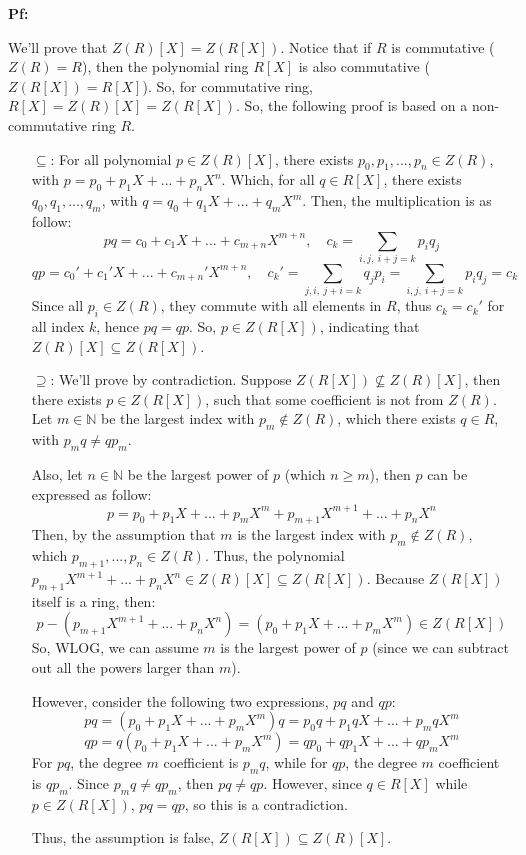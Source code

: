 \documentclass{article}
\begin{document}
\textbf{Pf:}

We'll prove that $Z(R)[X]=Z(R[X])$. Notice that if $R$ is commutative ($Z(R)=R$), then the polynomial ring $R[X]$ is also commutative ($Z(R[X])=R[X]$).
So, for commutative ring, $R[X]=Z(R)[X]=Z(R[X])$. So, the following proof is based on a non-commutative ring $R$.

\begin{itemize}
    \item[$\subseteq$:] For all polynomial $p\in Z(R)[X]$, there exists $p_0,p_1,...,p_n\in Z(R)$, with $p = p_0+p_1X+...+p_nX^n$.
    Which, for all $q\in R[X]$, there exists $q_0,q_1,...,q_m$, with $q = q_0+q_1X+...+q_mX^m$.
    Then, the multiplication is as follow:
    $$pq = c_0+c_1X+...+c_{m+n}X^{m+n},\quad c_k=\sum_{i,j,\ i+j=k}p_iq_j$$
    $$qp = c_0'+c_1'X+...+c_{m+n}'X^{m+n},\quad c_k' = \sum_{j,i,\ j+i=k}q_jp_i=\sum_{i,j,\ i+j=k}p_iq_j=c_k$$
    Since all $p_i\in Z(R)$, they commute with all elements in $R$, thus $c_k = c_k'$ for all index $k$,
    hence $pq=qp$. So, $p\in Z(R[X])$, indicating that $Z(R)[X]\subseteq Z(R[X])$.

    \hfill
    
    \item[$\supseteq$:] We'll prove by contradiction. Suppose $Z(R[X])\not\subseteq Z(R)[X]$, then there exists $p\in Z(R[X])$, such that some coefficient
    is not from $Z(R)$. Let $m\in\mathbb{N}$ be the largest index with $p_m\notin Z(R)$, which there exists $q\in R$, with $p_mq \neq qp_m$.

    Also, let $n\in\mathbb{N}$ be the largest power of $p$ (which $n \geq m$), then $p$ can be expressed as follow:
    $$p=p_0+p_1X+...+p_mX^m+p_{m+1}X^{m+1}+...+p_nX^n$$
    Then, by the assumption that $m$ is the largest index with $p_m\notin Z(R)$, which $p_{m+1},...,p_{n}\in Z(R)$.
    Thus, the polynomial $p_{m+1}X^{m+1}+...+p_nX^n\in Z(R)[X] \subseteq Z(R[X])$. Because $Z(R[X])$ itself is a ring, then:
    $$p-(p_{m+1}X^{m+1}+...+p_nX^n) = (p_0+p_1X+...+p_mX^m)\in Z(R[X])$$
    So, WLOG, we can assume $m$ is the largest power of $p$ (since we can subtract out all the powers larger than $m$).

    \hfill

    However, consider the following two expressions, $pq$ and $qp$:
    $$pq = (p_0+p_1X+...+p_mX^m)q = p_0q+p_1qX+...+p_mqX^m$$
    $$qp = q(p_0+p_1X+...+p_mX^m) = qp_0+qp_1X+...+qp_mX^m$$
    For $pq$, the degree $m$ coefficient is $p_mq$, while for $qp$, the degree $m$ coefficient is $qp_m$.
    Since $p_mq\neq qp_m$, then $pq\neq qp$. However, since $q\in R[X]$ while $p\in Z(R[X])$, $pq=qp$,
    so this is a contradiction.

    Thus, the assumption is false, $Z(R[X])\subseteq Z(R)[X]$.
\end{itemize}
\end{document}
